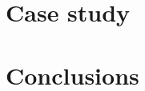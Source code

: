 \documentclass{ifacconf}
\begin{document}
% 
%
%    
  
    
    \section{Case study}
    
  \section{Conclusions}




\end{document}
